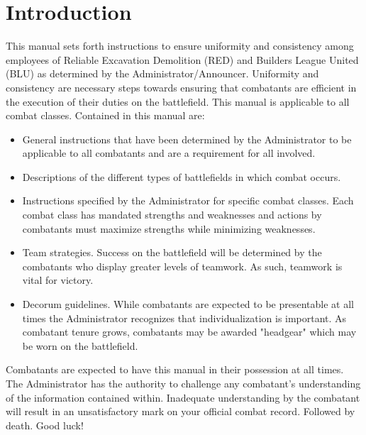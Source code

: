 \section{Introduction}
\label{Introduction}
This manual sets forth instructions to ensure uniformity and consistency among employees of Reliable Excavation Demolition (RED) and Builders League United (BLU) as determined by the Administrator/Announcer.  Uniformity and consistency are necessary steps towards ensuring that combatants are efficient in the execution of their duties on the battlefield. This manual is applicable to all combat classes.  Contained in this manual are:

 \begin{itemize}

\item General instructions that have been determined by the Administrator to be applicable to all combatants and are a requirement for all involved.
\item Descriptions of the different types of battlefields in which combat occurs.  
\item Instructions specified by the Administrator for specific combat classes.  Each combat class has mandated strengths and weaknesses and actions by combatants must maximize strengths while minimizing weaknesses.  
\item Team strategies.  Success on the battlefield will be determined by the combatants who display greater levels of teamwork.  As such, teamwork is vital for victory. 
\item Decorum guidelines.  While combatants are expected to be presentable at all times the Administrator recognizes that individualization is important. As combatant tenure grows, combatants may be awarded "headgear" which may be worn on the battlefield.
\end{itemize}
Combatants are expected to have this manual in their possession at all times. The Administrator has the authority to challenge any combatant's understanding of the information contained within. Inadequate understanding by the combatant will result in an unsatisfactory mark on your official combat record. Followed by death. Good luck!